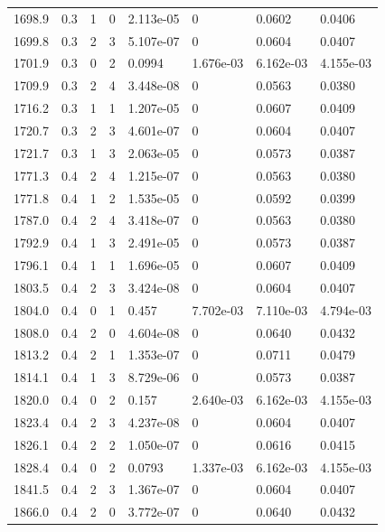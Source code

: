 \documentclass[preview]{standalone}
\begin{document}
{{{{{\begin{tabular}{L{1.2cm}C{1.2cm} C{0.3cm}C{0.5cm} C{1.4cm}C{1.4cm} C{1.4cm}C{1.4cm}}
  1698.9  &   0.3  & 1     &  0 &  2.113e-05  & 0  & 0.0602 &  0.0406   \\ 
  1699.8  &   0.3  & 2     &  3 &  5.107e-07  & 0  & 0.0604 &  0.0407   \\ 
  1701.9  &   0.3  & 0     &  2 &  0.0994  & 1.676e-03  & 6.162e-03 &  4.155e-03   \\ 
  1709.9  &   0.3  & 2     &  4 &  3.448e-08  & 0  & 0.0563 &  0.0380   \\ 
  1716.2  &   0.3  & 1     &  1 &  1.207e-05  & 0  & 0.0607 &  0.0409   \\ 
  1720.7  &   0.3  & 2     &  3 &  4.601e-07  & 0  & 0.0604 &  0.0407   \\ 
  1721.7  &   0.3  & 1     &  3 &  2.063e-05  & 0  & 0.0573 &  0.0387   \\ 
  1771.3  &   0.4  & 2     &  4 &  1.215e-07  & 0  & 0.0563 &  0.0380   \\ 
  1771.8  &   0.4  & 1     &  2 &  1.535e-05  & 0  & 0.0592 &  0.0399   \\ 
  1787.0  &   0.4  & 2     &  4 &  3.418e-07  & 0  & 0.0563 &  0.0380   \\ 
  1792.9  &   0.4  & 1     &  3 &  2.491e-05  & 0  & 0.0573 &  0.0387   \\ 
  1796.1  &   0.4  & 1     &  1 &  1.696e-05  & 0  & 0.0607 &  0.0409   \\ 
  1803.5  &   0.4  & 2     &  3 &  3.424e-08  & 0  & 0.0604 &  0.0407   \\ 
  1804.0  &   0.4  & 0     &  1 &  0.457  & 7.702e-03  & 7.110e-03 &  4.794e-03   \\ 
  1808.0  &   0.4  & 2     &  0 &  4.604e-08  & 0  & 0.0640 &  0.0432   \\ 
  1813.2  &   0.4  & 2     &  1 &  1.353e-07  & 0  & 0.0711 &  0.0479   \\ 
  1814.1  &   0.4  & 1     &  3 &  8.729e-06  & 0  & 0.0573 &  0.0387   \\ 
  1820.0  &   0.4  & 0     &  2 &  0.157  & 2.640e-03  & 6.162e-03 &  4.155e-03   \\ 
  1823.4  &   0.4  & 2     &  3 &  4.237e-08  & 0  & 0.0604 &  0.0407   \\ 
  1826.1  &   0.4  & 2     &  2 &  1.050e-07  & 0  & 0.0616 &  0.0415   \\ 
  1828.4  &   0.4  & 0     &  2 &  0.0793  & 1.337e-03  & 6.162e-03 &  4.155e-03   \\ 
  1841.5  &   0.4  & 2     &  3 &  1.367e-07  & 0  & 0.0604 &  0.0407   \\ 
  1866.0  &   0.4  & 2     &  0 &  3.772e-07  & 0  & 0.0640 &  0.0432   \\ 

\end{tabular}}}}}}
\end{document}
